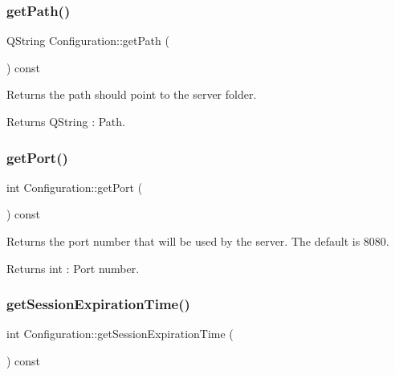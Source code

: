 \subsubsection{\texorpdfstring{get\+Path()}{getPath()}}
{\footnotesize\ttfamily Q\+String Configuration\+::get\+Path (\begin{DoxyParamCaption}{ }\end{DoxyParamCaption}) const}



Returns the path should point to the server folder. 

\begin{DoxyReturn}{Returns}
Q\+String \+: Path. 
\end{DoxyReturn}
\mbox{\label{class_configuration_ab34eb25aa1e175c7ac8323300b298a8a}} 
\subsubsection{\texorpdfstring{get\+Port()}{getPort()}}
{\footnotesize\ttfamily int Configuration\+::get\+Port (\begin{DoxyParamCaption}{ }\end{DoxyParamCaption}) const}



Returns the port number that will be used by the server. The default is 8080. 

\begin{DoxyReturn}{Returns}
int \+: Port number. 
\end{DoxyReturn}
\mbox{\label{class_configuration_af14b4f22fdcdfc32fbcac712a9868fd4}} 
\subsubsection{\texorpdfstring{get\+Session\+Expiration\+Time()}{getSessionExpirationTime()}}
{\footnotesize\ttfamily int Configuration\+::get\+Session\+Expiration\+Time (\begin{DoxyParamCaption}{ }\end{DoxyParamCaption}) const}



